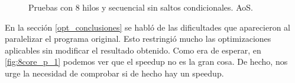 \documentclass{article}
\begin{document}
\begin{figure}
	\hspace*{-3.5cm}
	\caption{Pruebas con 8 hilos y secuencial sin saltos condicionales. AoS.}
	\label{fig:aos_8core_&_no_if}
\end{figure}

En la sección \ref{opt_conclusiones} se habló de las dificultades que aparecieron al paralelizar el programa
original. Esto restringió mucho las optimizaciones aplicables sin modificar el resultado obtenido.
Como era de esperar, en \ref{fig:8core_p_1} podemos ver que el speedup no es la gran cosa. De hecho, nos urge
la necesidad de comprobar si de hecho hay un speedup.
\end{document}
